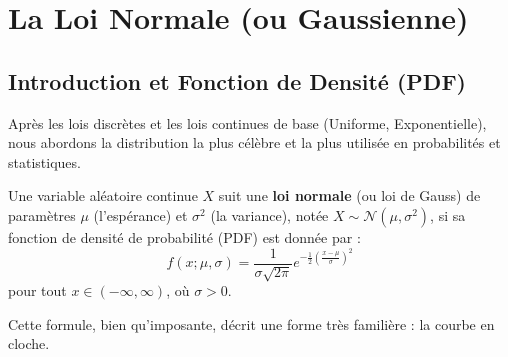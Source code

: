 \newpage
\section{La Loi Normale (ou Gaussienne)}

\subsection{Introduction et Fonction de Densité (PDF)}

Après les lois discrètes et les lois continues de base (Uniforme, Exponentielle), nous abordons la distribution la plus célèbre et la plus utilisée en probabilités et statistiques.

\begin{definitionbox}
Une variable aléatoire continue $X$ suit une \textbf{loi normale} (ou loi de Gauss) de paramètres $\mu$ (l'espérance) et $\sigma^2$ (la variance), notée $X \sim \mathcal{N}(\mu, \sigma^2)$, si sa fonction de densité de probabilité (PDF) est donnée par :
$$ f(x; \mu, \sigma) = \frac{1}{\sigma \sqrt{2\pi}} e^{ -\frac{1}{2} \left( \frac{x-\mu}{\sigma} \right)^2 } $$
pour tout $x \in (-\infty, \infty)$, où $\sigma > 0$.
\end{definitionbox}

Cette formule, bien qu'imposante, décrit une forme très familière : la courbe en cloche.

